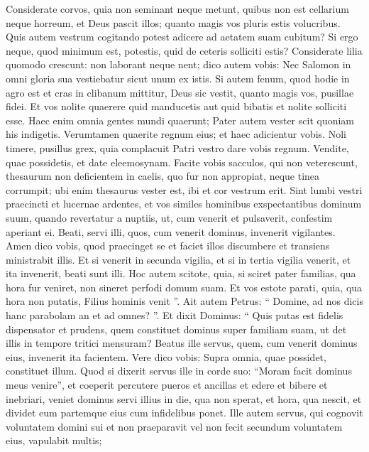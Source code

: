 \begin{biblechapter}
\begin{biblechapter}
\begin{biblechapter}
\begin{biblechapter}
\begin{biblechapter}
\begin{biblechapter}
\begin{biblechapter}
\begin{biblechapter}
\begin{biblechapter}
\begin{biblechapter}
\begin{biblechapter}
\begin{biblechapter}
\verse Considerate corvos, quia non seminant neque metunt, quibus non est cellarium neque horreum, et Deus pascit illos; quanto magis vos pluris estis volucribus. 
\verse Quis autem vestrum cogitando potest adicere ad aetatem suam cubitum? 
\verse Si ergo neque, quod minimum est, potestis, quid de ceteris solliciti estis? 
\verse Considerate lilia quomodo crescunt: non laborant neque nent; dico autem vobis: Nec Salomon in omni gloria sua vestiebatur sicut unum ex istis. 
\verse Si autem fenum, quod hodie in agro est et cras in clibanum mittitur, Deus sic vestit, quanto magis vos, pusillae fidei. 
\verse Et vos nolite quaerere quid manducetis aut quid bibatis et nolite solliciti esse. 
\verse Haec enim omnia gentes mundi quaerunt; Pater autem vester scit quoniam his indigetis. 
\verse Verumtamen quaerite regnum eius; et haec adicientur vobis.
 \verse Noli timere, pusillus grex, quia complacuit Patri vestro dare vobis regnum. 
\verse Vendite, quae possidetis, et date eleemosynam. Facite vobis sacculos, qui non veterescunt, thesaurum non deficientem in caelis, quo fur non appropiat, neque tinea corrumpit; 
\verse ubi enim thesaurus vester est, ibi et cor vestrum erit.
 \verse Sint lumbi vestri praecincti et lucernae ardentes, 
\verse et vos similes hominibus exspectantibus dominum suum, quando revertatur a nuptiis, ut, cum venerit et pulsaverit, confestim aperiant ei. 
\verse Beati, servi illi, quos, cum venerit dominus, invenerit vigilantes. Amen dico vobis, quod praecinget se et faciet illos discumbere et transiens ministrabit illis. 
\verse Et si venerit in secunda vigilia, et si in tertia vigilia venerit, et ita invenerit, beati sunt illi. 
\verse Hoc autem scitote, quia, si sciret pater familias, qua hora fur veniret, non sineret perfodi domum suam. 
\verse Et vos estote parati, quia, qua hora non putatis, Filius hominis venit ”.
 \verse Ait autem Petrus: “ Domine, ad nos dicis hanc parabolam an et ad omnes? ”. 
\verse Et dixit Dominus: “ Quis putas est fidelis dispensator et prudens, quem constituet dominus super familiam suam, ut det illis in tempore tritici mensuram? 
\verse Beatus ille servus, quem, cum venerit dominus eius, invenerit ita facientem. 
\verse Vere dico vobis: Supra omnia, quae possidet, constituet illum. 
\verse Quod si dixerit servus ille in corde suo: “Moram facit dominus meus venire”, et coeperit percutere pueros et ancillas et edere et bibere et inebriari, 
\verse veniet dominus servi illius in die, qua non sperat, et hora, qua nescit, et dividet eum partemque eius cum infidelibus ponet. 
\verse Ille autem servus, qui cognovit voluntatem domini sui et non praeparavit vel non fecit secundum voluntatem eius, vapulabit multis; 

\end{biblechapter}
\end{biblechapter}
\end{biblechapter}
\end{biblechapter}
\end{biblechapter}
\end{biblechapter}
\end{biblechapter}
\end{biblechapter}
\end{biblechapter}
\end{biblechapter}
\end{biblechapter}
\end{biblechapter}
